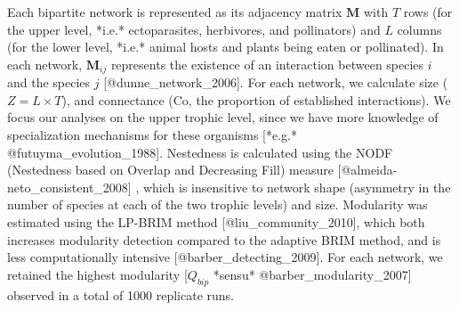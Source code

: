 Each bipartite network is represented as its adjacency matrix $\mathbf{M}$
with $T$ rows (for the upper level, *i.e.* ectoparasites, herbivores,
and pollinators) and $L$ columns (for the lower level, *i.e.* animal hosts
and plants being eaten or pollinated). In each network, $\mathbf{M}_{ij}$
represents the existence of an interaction between species $i$ and the
species $j$ [@dunne_network_2006]. For each network, we calculate size
($Z=L\times T$), and connectance ($\mathrm{Co}$, the proportion of established
interactions). We focus our analyses on the upper trophic level, since we
have more knowledge of specialization mechanisms for these organisms [*e.g.*
@futuyma_evolution_1988]. Nestedness is calculated using the NODF (Nestedness
based on Overlap and Decreasing Fill) measure [@almeida-neto_consistent_2008]
, which is insensitive to network shape (asymmetry in the number of species
at each of the two trophic levels) and size. Modularity was estimated using
the LP-BRIM method [@liu_community_2010], which both increases modularity
detection compared to the adaptive BRIM method, and is less computationally
intensive [@barber_detecting_2009]. For each network, we retained the highest
modularity [$Q_{bip}$ *sensu* @barber_modularity_2007] observed in a total
of 1000 replicate runs.
